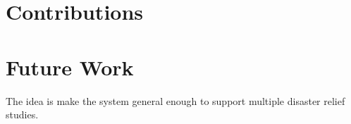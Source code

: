  
\section{Contributions}
\pagebreak

\section{Future Work}
\pagebreak
 
The idea is make the system general enough to support multiple disaster relief studies.